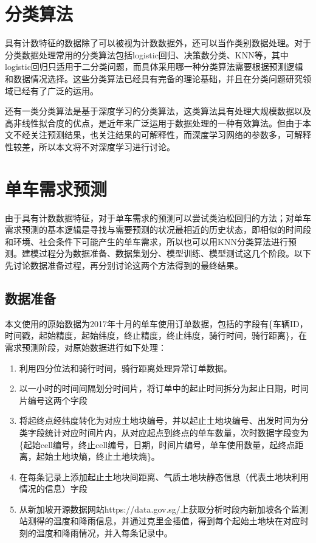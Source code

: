 \documentclass[]{tongjithesis}
\numberwithin{equation}{chapter}
\begin{document}
\section{分类算法}
具有计数特征的数据除了可以被视为计数数据外，还可以当作类别数据处理\cite{lukusa2020horvitz}。对于分类数据处理常用的分类算法包括logistic回归、决策数分类、KNN等，其中logistic回归只适用于二分类问题，而具体采用哪一种分类算法需要根据预测逻辑和数据情况选择。这些分类算法已经具有完备的理论基础，并且在分类问题研究领域已经有了广泛的运用。

还有一类分类算法是基于深度学习的分类算法，这类算法具有处理大规模数据以及高非线性拟合度的优点，是近年来广泛运用于数据处理的一种有效算法。但由于本文不经关注预测结果，也关注结果的可解释性，而深度学习网络的参数多，可解释性较差，所以本文将不对深度学习进行讨论。

\section{单车需求预测}
由于具有计数数据特征，对于单车需求的预测可以尝试类泊松回归的方法；对单车需求预测的基本逻辑是寻找与需要预测的状况最相近的历史状态，即相似的时间段和环境、社会条件下可能产生的单车需求，所以也可以用KNN分类算法进行预测。建模过程分为数据准备、数据集划分、模型训练、模型测试这几个阶段。以下先讨论数据准备过程，再分别讨论这两个方法得到的最终结果。


\subsection{数据准备}
本文使用的原始数据为2017年十月的单车使用订单数据，包括的字段有\{车辆ID，时间戳，起始精度，起始纬度，终止精度，终止纬度，骑行时间，骑行距离\}，在需求预测阶段，对原始数据进行如下处理：
\begin{enumerate}
	\item 利用四分位法和骑行时间，骑行距离处理异常订单数据。
	\item 以一小时的时间间隔划分时间片，将订单中的起止时间拆分为起止日期，时间片编号这两个字段
	\item 将起终点经纬度转化为对应土地块编号，并以起止土地块编号、出发时间为分类字段统计对应时间片内，从对应起点到终点的单车数量，次时数据字段变为\{起始cell编号，终止cell编号，日期，时间片编号，单车使用数量，起终点距离，起始土地块熵，终止土地块熵\}。
	\item 在每条记录上添加起止土地块间距离、气质土地块静态信息（代表土地块利用情况的信息）字段
	\item 从新加坡开源数据网站https://data.gov.sg/上获取分析时段内新加坡各个监测站测得的温度和降雨信息，并通过克里金插值，得到每个起始土地块在对应时刻的温度和降雨情况，并入每条记录中。
\end{enumerate}
\end{document}
